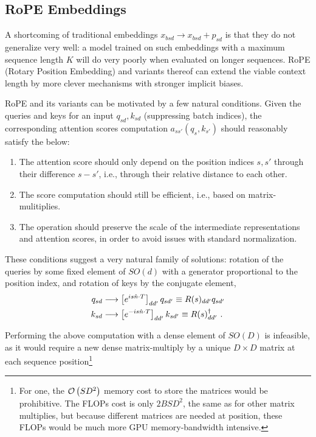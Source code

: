 \documentclass[11pt]{article}
\begin{document}
\subsection{RoPE Embeddings}

A shortcoming of traditional embeddings $ x _{ bsd } \longrightarrow x _{ bsd } + p _{ sd } $ is
that they do not generalize very well: a model trained on such embeddings with a maximum sequence
length $ K $ will do very poorly when evaluated on longer sequences. RoPE (Rotary Position
Embedding) and variants thereof can extend the viable context length by more clever mechanisms with
stronger implicit biases.

RoPE and its variants can be motivated by a few natural conditions.  Given the queries and keys for
an input $ q _{ sd }, k _{ sd } $ (suppressing batch indices), the corresponding attention scores computation $ a _{ ss' }\left ( q _{ s },
	k _{ s' } \right ) $ should reasonably satisfy the below:
\begin{enumerate}
	\item The attention score should only depend on the position indices $ s, s' $ through their difference
	      $ s-s' $, i.e., through their relative distance to each other.
	\item The score computation should still be efficient, i.e., based on matrix-mulitiplies.
	\item The operation should preserve the scale of the intermediate representations and attention
	      scores, in order to avoid issues with standard normalization.
\end{enumerate}
These conditions suggest a very natural family of solutions: rotation of the queries by some fixed
element of $ SO(d) $ with a generator proportional to the position index, and rotation of keys by
the conjugate element,
\begin{align}
	q _{ sd } & \longrightarrow \left [e^{ i s \hat{n}\cdot T }\right ]_{ d d' } q _{ sd' } \equiv R(s) _{ d d' } q _{ sd' } \nonumber\\
	k _{ sd } & \longrightarrow \left [e^{ -i s \hat{n}\cdot T }\right ]_{ d d' } k _{ sd' } \equiv  R(s)^{ \dagger } _{ d d' } \ . \label{eq_rope}
\end{align}

Performing the above computation with a dense element of $ SO(D) $ is infeasible, as it would require
a new dense matrix-multiply by a unique $ D \times D $ matrix at each sequence
position\footnote{For one, the $ \mathcal{O} \left( SD ^{ 2 } \right)  $ memory cost to store the matrices
    would be prohibitive. The FLOPs cost is only $ 2BSD ^{ 2 } $, the same as for other matrix
    multiplies, but because different matrices are needed at position, these FLOPs would be much more
    GPU memory-bandwidth intensive.
}
\end{document}

